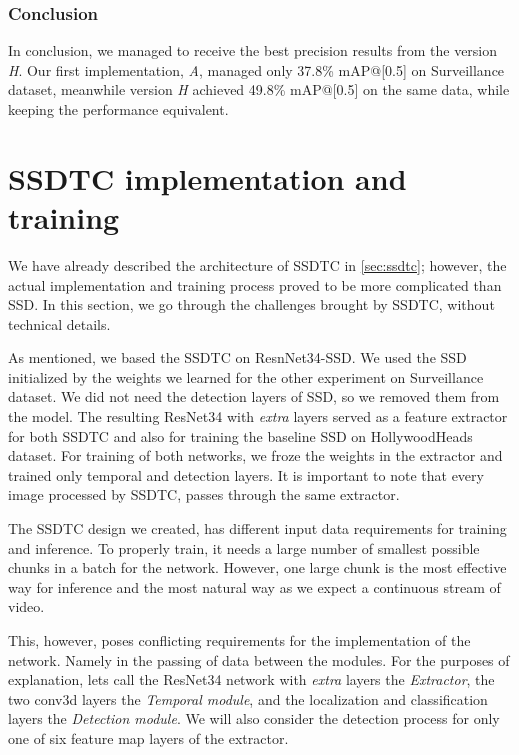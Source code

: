 \subsubsection{Conclusion}
In conclusion, we managed to receive the best precision results from the version \textit{H}. Our first implementation, \textit{A}, managed only 37.8\% mAP@[0.5] on Surveillance dataset, meanwhile version \textit{H} achieved 49.8\% mAP@[0.5] on the same data, while keeping the performance equivalent.

\section{SSDTC implementation and training}
\label{sec:ssdtcImpl}
We have already described the architecture of SSDTC in \cref{sec:ssdtc}; however, the actual implementation and training process proved to be more complicated than SSD. In this section, we go through the challenges brought by SSDTC, without technical details. 

As mentioned, we based the SSDTC on ResnNet34-SSD. We used the SSD initialized by the weights we learned for the other experiment on Surveillance dataset. We did not need the detection layers of SSD, so we removed them from the model. The resulting ResNet34 with \textit{extra} layers served as a feature extractor for both SSDTC and also for training the baseline SSD on HollywoodHeads dataset. For training of both networks, we froze the weights in the extractor and trained only temporal and detection layers. It is important to note that every image processed by SSDTC, passes through the same extractor. 


The SSDTC design we created, has different input data requirements for training and inference. To properly train, it needs a large number of smallest possible chunks in a batch for the network. However, one large chunk is the most effective way for inference and the most natural way as we expect a continuous stream of video.

This, however, poses conflicting requirements for the implementation of the network. Namely in the passing of data between the modules. For the purposes of explanation, lets call the ResNet34 network with \textit{extra} layers the \textit{Extractor}, the two conv3d layers the \textit{Temporal module}, and the localization and classification layers the \textit{Detection module}. We will also consider the detection process for only one of six feature map layers of the extractor. 

